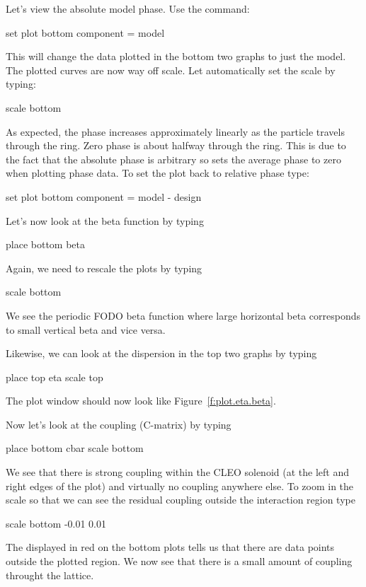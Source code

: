 Let's view the absolute model phase. Use the command:
\begin{example}
  set plot bottom component = model
\end{example}
This will change the data plotted in the bottom two graphs to just the
model.  The plotted curves are now way off scale. Let \tao automatically set
the scale by typing:
\begin{example}
  scale bottom
\end{example}
As expected, the phase increases approximately linearly as the particle travels through the
ring. Zero phase is about halfway through the ring. This is due to the fact that the absolute phase
is arbitrary so \tao sets the average phase to zero when plotting phase data. To set the plot back to
relative phase type:
\begin{example}
  set plot bottom component = model - design
\end{example}

Let's now look at the beta function by typing
\begin{example}
  place bottom beta
\end{example}
Again, we need to rescale the plots by typing
\begin{example}
  scale bottom
\end{example}
We see the periodic FODO beta function where large horizontal beta
corresponds to small vertical beta and vice versa.

Likewise, we can look at the dispersion in the top two graphs by
typing
\begin{example}
  place top eta
  scale top
\end{example}
The plot window should now look like Figure~\ref{f:plot.eta.beta}.

Now let's look at the coupling (C-matrix) by typing
\begin{example}
  place bottom cbar
  scale bottom
\end{example}
We see that there is strong coupling within the CLEO solenoid (at the left and right edges of the
plot) and virtually no coupling anywhere else. To zoom in the scale so that we can see the residual
coupling outside the interaction region type
\begin{example}
  scale bottom -0.01 0.01
\end{example}
The  displayed in red on the bottom plots tells us that there are data
points outside the plotted region.  We now see that there is a small amount of coupling throught the
lattice.

